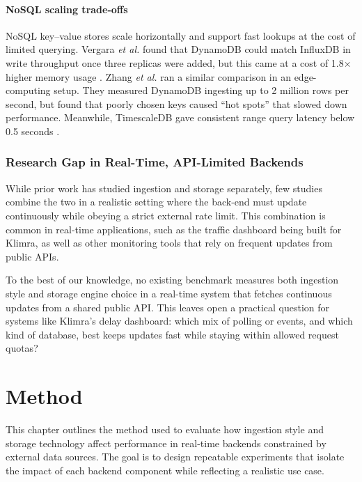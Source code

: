 \documentclass[nomenclature, english, biblatex]{kththesis}
\numberwithin{listing}{chapter}
\begin{document}
\subsubsection{NoSQL scaling trade-offs}
NoSQL key–value stores scale horizontally and support fast lookups at the cost of limited querying.  
Vergara \textit{et al.} found that DynamoDB could match InfluxDB in write throughput once three replicas were added, but this came at a cost of 1.8× higher memory usage \cite{Vergara2021PerformanceTSDB}.  
Zhang \textit{et al.} ran a similar comparison in an edge-computing setup.  
They measured DynamoDB ingesting up to 2 million rows per second, but found that poorly chosen keys caused “hot spots” that slowed down performance.  
Meanwhile, TimescaleDB gave consistent range query latency below 0.5 seconds \cite{Zhang2023EdgeTSDB}.



\subsection{Research Gap in Real-Time, API-Limited Backends}
While prior work has studied ingestion and storage separately, few studies combine the two in a realistic setting where the back-end must update continuously while obeying a strict external rate limit.
This combination is common in real-time applications, such as the traffic dashboard being built for Klimra, as well as other monitoring tools that rely on frequent updates from public \glspl{API}.

To the best of our knowledge, no existing benchmark measures both ingestion style and storage engine choice in a real-time system that fetches continuous updates from a shared public API.
This leaves open a practical question for systems like Klimra's delay dashboard: which mix of polling or events, and which kind of database, best keeps updates fast while staying within allowed request quotas?





\cleardoublepage
\chapter{Method}
\label{ch:methods}
This chapter outlines the method used to evaluate how ingestion style and storage technology affect performance in real-time backends constrained by external data sources. The goal is to design repeatable experiments that isolate the impact of each backend component while reflecting a realistic use case.
\end{document}
